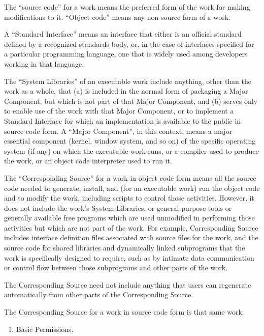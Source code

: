 \documentclass[letterpaper,10pt,english]{sphinxmanual}
\begin{document}
The “source code” for a work means the preferred form of the work
for making modifications to it.  “Object code” means any non-source
form of a work.

A “Standard Interface” means an interface that either is an official
standard defined by a recognized standards body, or, in the case of
interfaces specified for a particular programming language, one that
is widely used among developers working in that language.

The “System Libraries” of an executable work include anything, other
than the work as a whole, that (a) is included in the normal form of
packaging a Major Component, but which is not part of that Major
Component, and (b) serves only to enable use of the work with that
Major Component, or to implement a Standard Interface for which an
implementation is available to the public in source code form.  A
“Major Component”, in this context, means a major essential component
(kernel, window system, and so on) of the specific operating system
(if any) on which the executable work runs, or a compiler used to
produce the work, or an object code interpreter used to run it.

The “Corresponding Source” for a work in object code form means all
the source code needed to generate, install, and (for an executable
work) run the object code and to modify the work, including scripts to
control those activities.  However, it does not include the work’s
System Libraries, or general-purpose tools or generally available free
programs which are used unmodified in performing those activities but
which are not part of the work.  For example, Corresponding Source
includes interface definition files associated with source files for
the work, and the source code for shared libraries and dynamically
linked subprograms that the work is specifically designed to require,
such as by intimate data communication or control flow between those
subprograms and other parts of the work.

The Corresponding Source need not include anything that users
can regenerate automatically from other parts of the Corresponding
Source.

The Corresponding Source for a work in source code form is that
same work.
\begin{enumerate}
%
\setcounter{enumi}{1}
\item {} 
Basic Permissions.

\end{enumerate}
\end{document}
